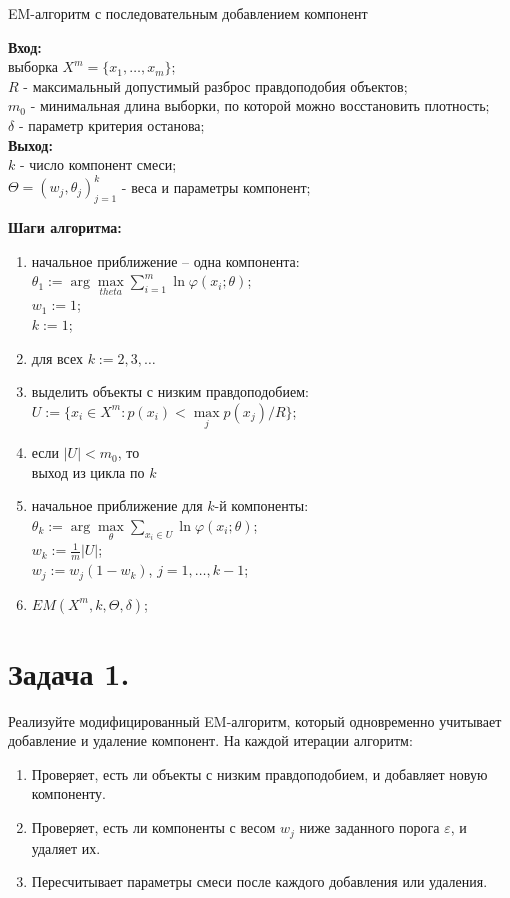 \begin{algorithm}[H]
    \caption{EM-алгоритм с последовательным добавлением компонент}
    \textbf{Вход:} \\
    выборка $X^m = \{x_1, \ldots, x_m\}$;\\
    $R$ - максимальный допустимый разброс правдоподобия объектов;\\
    $m_0$ - минимальная длина выборки, по которой можно восстановить плотность;\\
    $\delta$ - параметр критерия останова; \\
    \textbf{Выход:} \\
    $k$ - число компонент смеси;\\
    $\Theta = (w_j, \theta_j)_{j = 1}^k$ - веса и параметры компонент;

    \textbf{Шаги алгоритма:}
    \begin{enumerate}
        \item начальное приближение -- одна компонента:\\
              $\theta_1 := \arg\max\limits_{theta}\sum\limits_{i=1}^m \ln{\varphi(x_i; \theta)}$; \\
              $w_1 := 1$;\\
              $k := 1$;
        \item для всех $k := 2, 3, \ldots$
        \item выделить объекты с низким правдоподобием: \\
              $U := \{x_i \in X^m : p(x_i) < \max\limits_{j} p(x_j) / R\}$;
        \item если $|U| < m_0$, то \\
              выход из цикла по $k$
        \item начальное приближение для $k$-й компоненты:\\
              $\theta_k := \arg\max\limits_{\theta}\sum\limits_{x_i \in U} \ln{\varphi(x_i; \theta)}$;\\
              $w_k := \frac{1}{m}|U|$; \\
              $w_j := w_j(1 - w_k)$, $j = 1, \ldots, k - 1$;
        \item $EM(X^m, k, \Theta, \delta)$;
    \end{enumerate}
\end{algorithm}

\section*{\textbf{Задача 1.}} Реализуйте модифицированный EM-алгоритм, который одновременно учитывает добавление и удаление компонент. На каждой итерации алгоритм:
\begin{enumerate}
    \item Проверяет, есть ли объекты с низким правдоподобием, и добавляет новую компоненту.
    \item Проверяет, есть ли компоненты с весом $w_j$ ниже заданного порога $\varepsilon$, и удаляет их.
    \item Пересчитывает параметры смеси после каждого добавления или удаления.
\end{enumerate}


